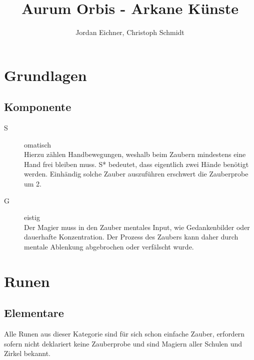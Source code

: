 \documentclass[a4paper,12pt,oneside]{book}
\title{Aurum Orbis - Arkane Künste}
\author{Jordan Eichner, Christoph Schmidt}
\date{}
\begin{document}
\maketitle
\tableofcontents

\part{Grundlagen}

\chapter{Komponente}
\begin{description}
\item[S]omatisch
\\Hierzu zählen Handbewegungen, weshalb beim Zaubern mindestens eine Hand frei bleiben muss. S* bedeutet, dass eigentlich zwei Hände benötigt werden. Einhändig solche Zauber auszuführen erschwert die Zauberprobe um 2.
\item[G]eistig
\\Der Magier muss in den Zauber mentales Input, wie Gedankenbilder oder dauerhafte Konzentration. Der Prozess des Zaubers kann daher durch mentale Ablenkung abgebrochen oder verfälscht wurde. 
\end{description}


\part{Runen}

\chapter{Elementare}
Alle Runen aus dieser Kategorie sind für sich schon einfache Zauber, erfordern sofern nicht deklariert keine Zauberprobe und sind Magiern aller Schulen und Zirkel bekannt.
\end{document}
